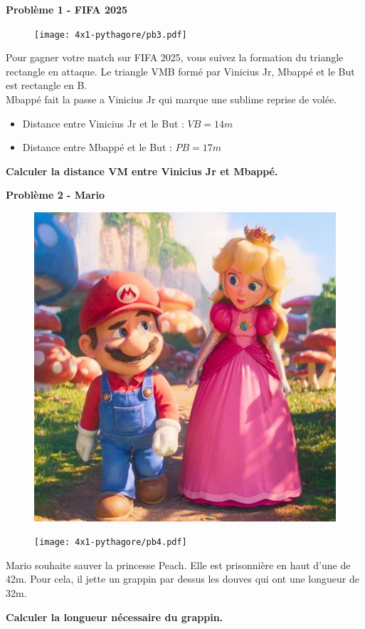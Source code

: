 \textbf{Problème 1 - FIFA 2025} \\

\begin{figure}[H]
  \centering
  \texttt{[image: 4x1-pythagore/pb3.pdf]}
\end{figure}
  
Pour gagner votre match sur FIFA 2025, vous suivez la formation du triangle rectangle en attaque. Le triangle VMB formé par Vinicius Jr, Mbappé et le But est rectangle en B. \\
  
Mbappé fait la passe a Vinicius Jr qui marque une sublime reprise de volée. 
  
\begin{itemize}
  \item Distance entre Vinicius Jr et le But : $VB = 14m$
  \item Distance entre Mbappé et le But : $PB = 17m$
\end{itemize}
  
\textbf{Calculer la distance VM entre Vinicius Jr et Mbappé.} 

\newpage

\begin{multicols}{2} 
  \textbf{Problème 2 - Mario} \\
  
  \begin{figure}[H]
    \centering
    \includegraphics[width=0.3\linewidth]{4x1-pythagore/pb4-mario.png}
  \end{figure}

  \begin{figure}[H]
    \centering
    \texttt{[image: 4x1-pythagore/pb4.pdf]}
  \end{figure}
\end{multicols}

Mario souhaite sauver la princesse Peach. Elle est prisonnière en haut d'une de 42m. Pour cela, il jette un grappin par dessus les douves qui ont une longueur de 32m.
  
\textbf{Calculer la longueur nécessaire du grappin.} \\

